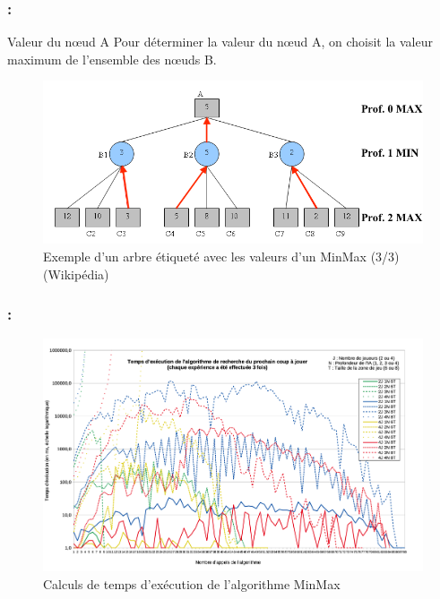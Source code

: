 \documentclass[9pt]{beamer}
\begin{document}
\begin{frame}[fragile]
\frametitle{\insertsectionhead : \insertsubsectionhead}
\begin{block}{Valeur du nœud A}
Pour déterminer la valeur du nœud A, on choisit la valeur maximum de l’ensemble des nœuds B.
\end{block}
\begin{figure}[h]
    \begin{center}
    \vspace{-5px}
    \caption{Exemple d’un arbre étiqueté avec les valeurs d'un MinMax (3/3) (Wikipédia)}
    \vspace{-5px}
    \includegraphics[width=1\textwidth]{figures/minmax3.png}
    \end{center}
\end{figure}
\end{frame}

\begin{frame}[fragile]
\frametitle{\insertsectionhead : \insertsubsectionhead}
\begin{figure}[h]
    \begin{center}
        \includegraphics[width=1\textwidth]{figures/temps_exec.png}
        \vspace{-15px}
        \caption{Calculs de temps d'exécution de l’algorithme MinMax}
    \end{center}
\end{figure}
\end{frame}
\end{document}

